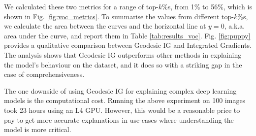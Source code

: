 \begin{table}[t]
	\centering
	\caption{Evaluation of different attribution methods on 100 randomly sampled images from the Pascal VOC test set. Fig. \ref{fig:voc_metrics} shows the curves where these metrics are extracted from.}
	\label{tab:results_voc}
\end{table}

We calculated these two metrics for a range of top-$k$\%s, from 1\% to 56\%, which is shown in Fig. \ref{fig:voc_metrics}. To summarise the values from different top-$k$\%s, we calculate the area between the curves and the horizontal line at $y = 0$, a.k.a. area under the curve, and report them in Table \ref{tab:results_voc}.   Fig. \ref{fig:puppy} provides a qualitative comparison between Geodesic IG and Integrated Gradients. The analysis shows that Geodesic IG outperforms other methods in explaining the model's behaviour on the dataset, and it does so with a striking gap in the case of comprehensiveness.

The one downside of using Geodesic IG for explaining complex deep learning models is the computational cost. Running the above experiment on 100 images took 23 hours using an L4 GPU. However, this would be a reasonable price to pay to get more accurate explanations in use-cases where understanding the model is more critical.